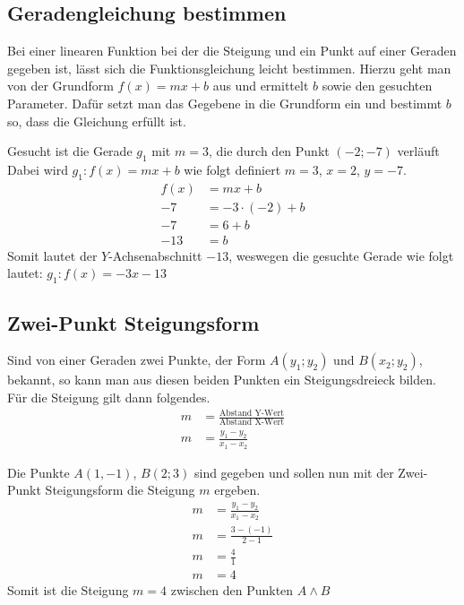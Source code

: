 \subsection{Geradengleichung bestimmen}\label{sec:Lineare Funktionen/Geradengleichung}
Bei einer linearen Funktion bei der die Steigung und ein Punkt auf einer Geraden gegeben ist, lässt sich die Funktionsgleichung leicht bestimmen. Hierzu geht man von der Grundform $f(x)=mx+b$ aus und ermittelt $b$ sowie den gesuchten Parameter. Dafür setzt man das Gegebene in die Grundform ein und bestimmt $b$ so, dass die Gleichung erfüllt ist.

\begin{beispiel}
Gesucht ist die Gerade $g_1$ mit $m=3$, die durch den Punkt $(-2;-7)$ verläuft
Dabei wird $g_1:f(x)=mx+b$ wie folgt definiert $m=3$, $x=2$, $y=-7$.
\begin{align*}
	f(x)&=mx+b\\
	-7&=-3\cdot (-2)+b\\
	-7&=6+b\\
	-13&=b
\end{align*}
Somit lautet der $Y$-Achsenabschnitt $-13$, weswegen die gesuchte Gerade wie folgt lautet: $g_1:f(x)=-3x-13$
\end{beispiel}
\subsection{Zwei-Punkt Steigungsform}\label{sec:Lineare Funktionen/Zwei-Punkt Steigungsform}
Sind von einer Geraden zwei Punkte, der Form $A(y_1;y_2)$ und $B(x_2;y_2)$, bekannt, so kann man aus diesen beiden Punkten ein Steigungsdreieck bilden. Für die Steigung gilt dann folgendes.
\begin{align*}
	m&=\frac{\text{Abstand Y-Wert}}{\text{Abstand X-Wert}}\\
	m&=\frac{y_1-y_2}{x_1-x_2}
\end{align*}

\begin{beispiel}
Die Punkte $A(1,-1)$, $B(2;3)$ sind gegeben und sollen nun mit der Zwei-Punkt Steigungsform die Steigung $m$ ergeben. 
	\begin{align*}
		m&=\frac{y_1-y_2}{x_1-x_2}\\
		m&=\frac{3-(-1)}{2-1}\\
		m&=\frac{4}{1}\\
		m&=4
	\end{align*}
	Somit ist die Steigung $m=4$ zwischen den Punkten $A\land B$
\end{beispiel}

